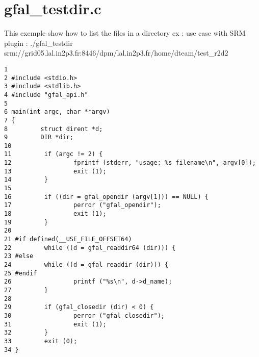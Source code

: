 \section{gfal\_\-testdir.c}
This exemple show how to list the files in a directory ex : use case with SRM plugin : ./gfal\_\-testdir srm://grid05.lal.in2p3.fr:8446/dpm/lal.in2p3.fr/home/dteam/test\_\-r2d2



\begin{DocInclude}\begin{verbatim}1 
2 #include <stdio.h>
3 #include <stdlib.h>
4 #include "gfal_api.h"
5 
6 main(int argc, char **argv)
7 {
8         struct dirent *d;
9         DIR *dir;
10 
11         if (argc != 2) {
12                 fprintf (stderr, "usage: %s filename\n", argv[0]);
13                 exit (1);
14         }
15 
16         if ((dir = gfal_opendir (argv[1])) == NULL) {
17                 perror ("gfal_opendir");
18                 exit (1);
19         }
20 
21 #if defined(__USE_FILE_OFFSET64)
22         while ((d = gfal_readdir64 (dir))) {
23 #else
24         while ((d = gfal_readdir (dir))) {
25 #endif
26                 printf ("%s\n", d->d_name);
27         }
28 
29         if (gfal_closedir (dir) < 0) {
30                 perror ("gfal_closedir");
31                 exit (1);
32         }
33         exit (0);
34 }
\end{verbatim}
\end{DocInclude}
 
